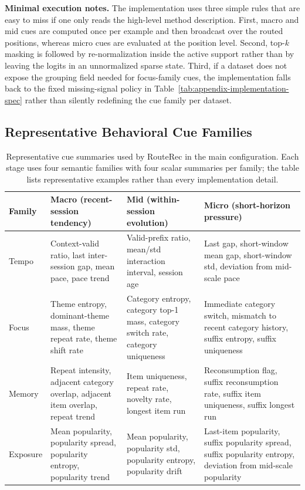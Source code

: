 \documentclass[sigconf,review,anonymous]{acmart}
\begin{document}
\noindent\textbf{Minimal execution notes.}
The implementation uses three simple rules that are easy to miss if one only reads the high-level method description. First, macro and mid cues are computed once per example and then broadcast over the routed positions, whereas micro cues are evaluated at the position level. Second, top-$k$ masking is followed by re-normalization inside the active support rather than by leaving the logits in an unnormalized sparse state. Third, if a dataset does not expose the grouping field needed for focus-family cues, the implementation falls back to the fixed missing-signal policy in Table~\ref{tab:appendix-implementation-spec} rather than silently redefining the cue family per dataset.

\subsection{Representative Behavioral Cue Families}

\begin{table}[!t]
  \centering
  \caption{Representative cue summaries used by RouteRec in the main configuration. Each stage uses four semantic families with four scalar summaries per family; the table lists representative examples rather than every implementation detail.}
  \label{tab:appendix-feature-families}
  \footnotesize
  \setlength{\tabcolsep}{4pt}
  \renewcommand{\arraystretch}{1.05}
  \begin{tabularx}{\textwidth}{@{}lXXX@{}}
    \toprule
    Family & Macro (recent-session tendency) & Mid (within-session evolution) & Micro (short-horizon pressure) \\
    \midrule
    Tempo & Context-valid ratio, last inter-session gap, mean pace, pace trend & Valid-prefix ratio, mean/std interaction interval, session age & Last gap, short-window mean gap, short-window std, deviation from mid-scale pace \\
    Focus & Theme entropy, dominant-theme mass, theme repeat rate, theme shift rate & Category entropy, category top-1 mass, category switch rate, category uniqueness & Immediate category switch, mismatch to recent category history, suffix entropy, suffix uniqueness \\
    Memory & Repeat intensity, adjacent category overlap, adjacent item overlap, repeat trend & Item uniqueness, repeat rate, novelty rate, longest item run & Reconsumption flag, suffix reconsumption rate, suffix item uniqueness, suffix longest run \\
    Exposure & Mean popularity, popularity spread, popularity entropy, popularity trend & Mean popularity, popularity std, popularity entropy, popularity drift & Last-item popularity, suffix popularity spread, suffix popularity entropy, deviation from mid-scale popularity \\
    \bottomrule
  \end{tabularx}
\end{table}
\end{document}
